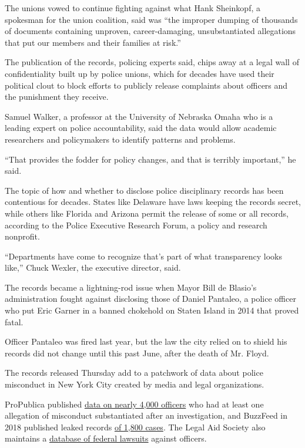 The unions vowed to continue fighting against what Hank Sheinkopf, a
spokesman for the union coalition, said was ``the improper dumping of
thousands of documents containing unproven, career-damaging,
unsubstantiated allegations that put our members and their families at
risk.''

The publication of the records, policing experts said, chips away at a
legal wall of confidentiality built up by police unions, which for
decades have used their political clout to block efforts to publicly
release complaints about officers and the punishment they receive.

Samuel Walker, a professor at the University of Nebraska Omaha who is a
leading expert on police accountability, said the data would allow
academic researchers and policymakers to identify patterns and problems.

``That provides the fodder for policy changes, and that is terribly
important,'' he said.

The topic of how and whether to disclose police disciplinary records has
been contentious for decades. States like Delaware have laws keeping the
records secret, while others like Florida and Arizona permit the release
of some or all records, according to the Police Executive Research
Forum, a policy and research nonprofit.

``Departments have come to recognize that's part of what transparency
looks like,'' Chuck Wexler, the executive director, said.

The records became a lightning-rod issue when Mayor Bill de Blasio's
administration fought against disclosing those of Daniel Pantaleo, a
police officer who put Eric Garner in a banned chokehold on Staten
Island in 2014 that proved fatal.

Officer Pantaleo was fired last year, but the law the city relied on to
shield his records did not change until this past June, after the death
of Mr. Floyd.

The records released Thursday add to a patchwork of data about police
misconduct in New York City created by media and legal organizations.

ProPublica published
\href{https://projects.propublica.org/nypd-ccrb/}{data on nearly 4,000
officers} who had at least one allegation of misconduct substantiated
after an investigation, and BuzzFeed in 2018 published leaked records
\href{https://www.buzzfeednews.com/article/kendalltaggart/nypd-police-misconduct-database}{of
1,800 cases}. The Legal Aid Society also maintains a
\href{https://www.capstat.nyc/}{database of federal lawsuits} against
officers.


